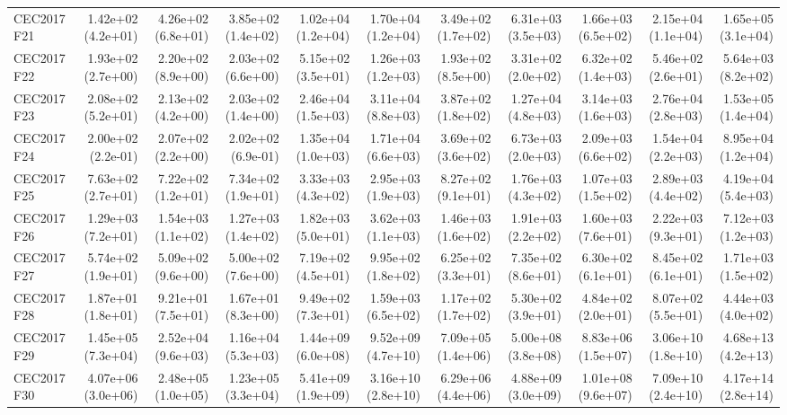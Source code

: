 \begin{longtable}{lrrrrrrrrrr}
CEC2017 F21 & 1.42e+02 (4.2e+01) & 4.26e+02 (6.8e+01) & 3.85e+02 (1.4e+02) & 1.02e+04 (1.2e+04) & 1.70e+04 (1.2e+04) & 3.49e+02 (1.7e+02) & 6.31e+03 (3.5e+03) & 1.66e+03 (6.5e+02) & 2.15e+04 (1.1e+04) & 1.65e+05 (3.1e+04) \\
CEC2017 F22 & 1.93e+02 (2.7e+00) & 2.20e+02 (8.9e+00) & 2.03e+02 (6.6e+00) & 5.15e+02 (3.5e+01) & 1.26e+03 (1.2e+03) & 1.93e+02 (8.5e+00) & 3.31e+02 (2.0e+02) & 6.32e+02 (1.4e+03) & 5.46e+02 (2.6e+01) & 5.64e+03 (8.2e+02) \\
CEC2017 F23 & 2.08e+02 (5.2e+01) & 2.13e+02 (4.2e+00) & 2.03e+02 (1.4e+00) & 2.46e+04 (1.5e+03) & 3.11e+04 (8.8e+03) & 3.87e+02 (1.8e+02) & 1.27e+04 (4.8e+03) & 3.14e+03 (1.6e+03) & 2.76e+04 (2.8e+03) & 1.53e+05 (1.4e+04) \\
CEC2017 F24 & 2.00e+02 (2.2e-01) & 2.07e+02 (2.2e+00) & 2.02e+02 (6.9e-01) & 1.35e+04 (1.0e+03) & 1.71e+04 (6.6e+03) & 3.69e+02 (3.6e+02) & 6.73e+03 (2.0e+03) & 2.09e+03 (6.6e+02) & 1.54e+04 (2.2e+03) & 8.95e+04 (1.2e+04) \\
CEC2017 F25 & 7.63e+02 (2.7e+01) & 7.22e+02 (1.2e+01) & 7.34e+02 (1.9e+01) & 3.33e+03 (4.3e+02) & 2.95e+03 (1.9e+03) & 8.27e+02 (9.1e+01) & 1.76e+03 (4.3e+02) & 1.07e+03 (1.5e+02) & 2.89e+03 (4.4e+02) & 4.19e+04 (5.4e+03) \\
CEC2017 F26 & 1.29e+03 (7.2e+01) & 1.54e+03 (1.1e+02) & 1.27e+03 (1.4e+02) & 1.82e+03 (5.0e+01) & 3.62e+03 (1.1e+03) & 1.46e+03 (1.6e+02) & 1.91e+03 (2.2e+02) & 1.60e+03 (7.6e+01) & 2.22e+03 (9.3e+01) & 7.12e+03 (1.2e+03) \\
CEC2017 F27 & 5.74e+02 (1.9e+01) & 5.09e+02 (9.6e+00) & 5.00e+02 (7.6e+00) & 7.19e+02 (4.5e+01) & 9.95e+02 (1.8e+02) & 6.25e+02 (3.3e+01) & 7.35e+02 (8.6e+01) & 6.30e+02 (6.1e+01) & 8.45e+02 (6.1e+01) & 1.71e+03 (1.5e+02) \\
CEC2017 F28 & 1.87e+01 (1.8e+01) & 9.21e+01 (7.5e+01) & 1.67e+01 (8.3e+00) & 9.49e+02 (7.3e+01) & 1.59e+03 (6.5e+02) & 1.17e+02 (1.7e+02) & 5.30e+02 (3.9e+01) & 4.84e+02 (2.0e+01) & 8.07e+02 (5.5e+01) & 4.44e+03 (4.0e+02) \\
CEC2017 F29 & 1.45e+05 (7.3e+04) & 2.52e+04 (9.6e+03) & 1.16e+04 (5.3e+03) & 1.44e+09 (6.0e+08) & 9.52e+09 (4.7e+10) & 7.09e+05 (1.4e+06) & 5.00e+08 (3.8e+08) & 8.83e+06 (1.5e+07) & 3.06e+10 (1.8e+10) & 4.68e+13 (4.2e+13) \\
CEC2017 F30 & 4.07e+06 (3.0e+06) & 2.48e+05 (1.0e+05) & 1.23e+05 (3.3e+04) & 5.41e+09 (1.9e+09) & 3.16e+10 (2.8e+10) & 6.29e+06 (4.4e+06) & 4.88e+09 (3.0e+09) & 1.01e+08 (9.6e+07) & 7.09e+10 (2.4e+10) & 4.17e+14 (2.8e+14) \\

\end{longtable}
